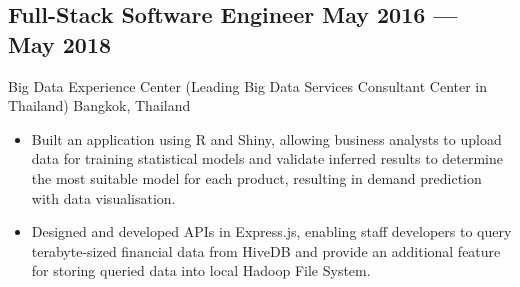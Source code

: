 \documentclass{article}
\newcommand{\subtext}[1]{
#1\par\vspace{-0.2cm}}
\newenvironment{zitemize}{
\begin{itemize}\itemsep0pt \parskip0pt \parsep1pt}
{\end{itemize}\vspace{-0.5cm}}
\begin{document}
        \subsection*{Full-Stack Software Engineer \hfill May 2016 --- May 2018} 
        \subtext{Big Data Experience Center {\scriptsize (Leading Big Data Services Consultant Center in Thailand)} \hfill Bangkok, Thailand} 
            \vspace{0.05cm}
            \begin{zitemize}
                \item Built an application using R and Shiny, allowing business analysts to upload data for training statistical models
                    and validate inferred results to determine the most suitable model for each product, resulting in demand prediction with data visualisation.
                \item Designed and developed APIs in Express.js, enabling staff developers to query terabyte-sized financial data from HiveDB
                    and provide an additional feature for storing queried data into local Hadoop File System.
            \end{zitemize}


        
\end{document}
